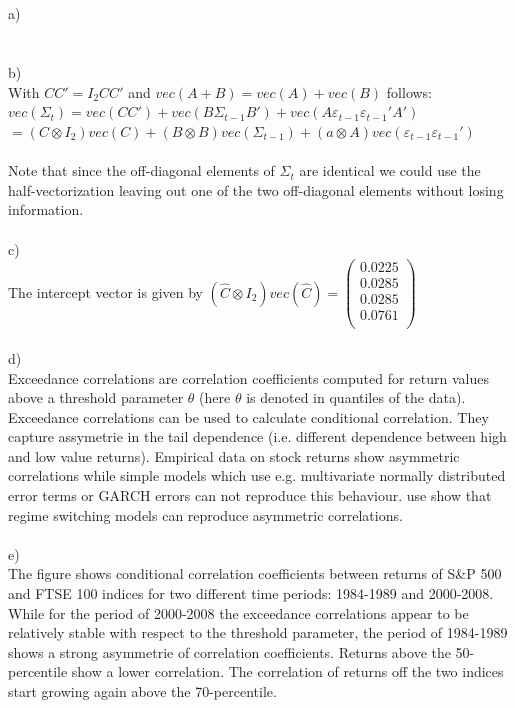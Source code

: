 \documentclass[11pt]{article}
\begin{document}
\subsection{}
a) \\
\\
\\
b) \\
With $CC' = I_2CC'$ and $vec(A+B) = vec(A) + vec(B)$ follows: \\
$vec(\Sigma_t) = vec(CC') + vec(B\Sigma_{t-1}B') + vec(A\varepsilon_{t-1}\varepsilon_{t-1}'A')$ \\ $ = (C \otimes I_2 )vec(C) + (B \otimes B)vec(\Sigma_{t-1}) + (a \otimes A)vec(\varepsilon_{t-1}\varepsilon_{t-1}')$
\\
\\
Note that since the off-diagonal elements of $\Sigma_t$ are identical we could use the half-vectorization leaving out one of the two off-diagonal elements without losing information.
\\
\\
c) \\
The intercept vector is given by $(\hat C \otimes I_2)vec(\hat C) = \begin{pmatrix} 0.0225 \\ 0.0285 \\ 0.0285 \\ 0.0761 \\ \end{pmatrix}$
\\
\\
d) \\
Exceedance correlations are correlation coefficients computed for return values above a threshold parameter $\theta$ (here $\theta$ is denoted in quantiles of the data). Exceedance correlations can be used to calculate conditional correlation. They capture assymetrie in the tail dependence (i.e. different dependence between high and low value returns). Empirical data on stock returns show asymmetric correlations while simple models which use e.g. multivariate normally distributed error terms or GARCH errors can not reproduce this behaviour. \citet{ang2002international} use show that regime switching models can reproduce asymmetric correlations.
\\
\\
e) \\
The figure shows conditional correlation coefficients between returns of S\&P 500 and FTSE 100 indices for two different time periods: 1984-1989 and 2000-2008. While for the period of 2000-2008 the exceedance correlations appear to be relatively stable with respect to the threshold parameter, the period of 1984-1989 shows a strong asymmetrie of correlation coefficients. Returns above the 50-percentile show a lower correlation. The correlation of returns off the two indices start growing again above the 70-percentile.


\end{document}

